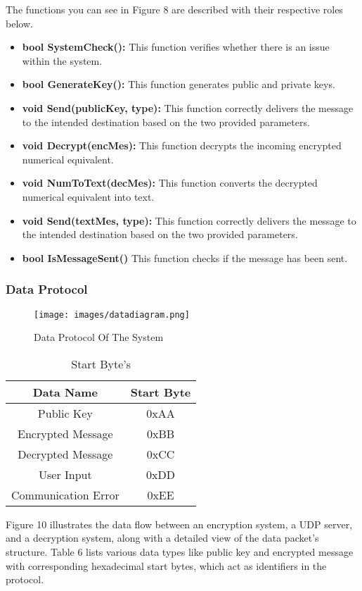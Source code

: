 \documentclass[12pt]{article}
\begin{document}
The functions you can see in Figure 8  are described with their respective roles below.
\begin{itemize}
	\item \textbf{bool SystemCheck():}  This function verifies whether there is an issue within the system.
	\item \textbf{bool GenerateKey():} This function generates public and private keys.
	\item \textbf{void Send(publicKey, type):} 	This function correctly delivers the message to the intended destination based on the two provided parameters.
	\item \textbf{void Decrypt(encMes):} This function decrypts the incoming encrypted numerical equivalent.
	\item \textbf{void NumToText(decMes):} This function converts the decrypted numerical equivalent into text.
	\item \textbf{void Send(textMes, type):} This function correctly delivers the message to the intended destination based on the two provided parameters.
	\item \textbf {bool IsMessageSent()} This function checks if the message has been sent.
\end{itemize}
 \newpage
 \subsubsection{Data Protocol}
 \begin{figure}[H]
 	\centering
 	\label{}
 	\texttt{[image: images/datadiagram.png]}\\[0.5 cm]	
 	\caption{Data Protocol Of The System} 		
 \end{figure}
 \begin{table}[H]	
 	\centering
 	\begin{tabular}{|c|c|}
 		\hline
 		Data Name & Start Byte  \\
 		\hline
 		Public Key &  0xAA \\ \hline
 		Encrypted Message &  0xBB \\ \hline
 		Decrypted Message &  0xCC  \\ \hline
 		User Input & 0xDD  \\ \hline
 		Communication Error &  0xEE \\ \hline
 	\end{tabular}
	\caption{Start Byte's} 
\end{table}
 Figure 10 illustrates the data flow between an encryption system, a UDP server, and a decryption system, along with a detailed view of the data packet's structure. Table 6 lists various data types like public key and encrypted message with corresponding hexadecimal start bytes, which act as identifiers in the protocol.
 	\newpage
\end{document}
